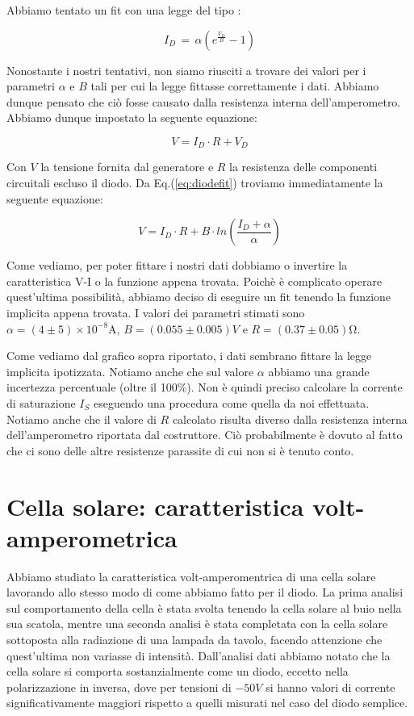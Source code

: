 Abbiamo tentato un fit con una legge del tipo : 

\begin{equation}
I_{D} \, = \, \alpha \left( e^{\frac{V_{D}}{B}} -1 \right)
\label{eq:diodefit}
\end{equation}

Nonostante i nostri tentativi, non siamo riusciti a trovare dei valori per i parametri $\alpha$ e $B$ tali per cui la legge fittasse correttamente i dati. Abbiamo dunque pensato che ciò fosse causato dalla resistenza interna dell'amperometro. Abbiamo dunque impostato la seguente equazione:

$$V=I_D \cdot R + V_D$$

Con $V$ la tensione fornita dal generatore e $R$ la resistenza delle componenti circuitali escluso il diodo. Da Eq.(\ref{eq:diodefit}) troviamo immediatamente la seguente equazione:

\begin{equation}
V=I_D \cdot R + B \cdot ln (\frac{I_D+\alpha}{\alpha})
\label{eq:diodefit2}
\end{equation}

Come vediamo, per poter fittare i nostri dati dobbiamo o invertire la caratteristica V-I o la funzione appena trovata. Poichè è complicato operare quest'ultima possibilità, abbiamo deciso di eseguire un fit tenendo la funzione implicita appena trovata. I valori dei parametri stimati sono $\alpha=(4\pm 5)\times 10^{-8} \si{\ampere}$, $B=(0.055\pm 0.005)V $ e $R=(0.37\pm 0.05)\si{\ohm}$.

Come vediamo dal grafico sopra riportato, i dati sembrano fittare la legge implicita ipotizzata. Notiamo anche che sul valore $\alpha$ abbiamo una grande incertezza percentuale (oltre il 100\%). Non è quindi preciso calcolare la corrente di saturazione $I_S$ eseguendo una procedura come quella da noi effettuata. Notiamo anche che il valore di $R$ calcolato risulta diverso dalla resistenza interna dell'amperometro riportata dal costruttore. Ciò probabilmente è dovuto al fatto che ci sono delle altre resistenze parassite di cui non si è tenuto conto. 
 
\section{Cella solare: caratteristica volt-amperometrica}

Abbiamo studiato la caratteristica volt-amperomentrica di una cella solare lavorando allo stesso modo di come abbiamo fatto per il diodo.
La prima analisi sul comportamento della cella è stata svolta tenendo la cella solare al buio nella sua scatola, mentre una seconda analisi è stata completata con la cella solare sottoposta alla radiazione di una lampada da tavolo, facendo attenzione che quest'ultima non variasse di intensità.
Dall'analisi dati abbiamo notato che la cella solare si comporta sostanzialmente come un diodo, eccetto nella polarizzazione in inversa, dove per tensioni di $-50V$ si hanno valori di corrente significativamente maggiori rispetto a quelli misurati nel caso del diodo semplice. 

